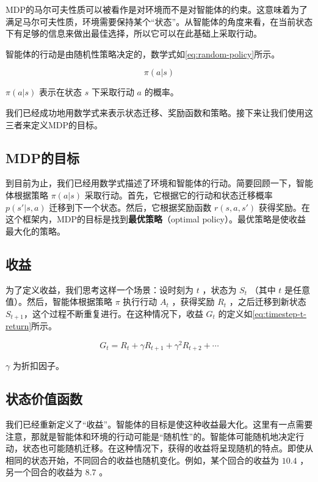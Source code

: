 \documentclass[lang=cn,newtx,10pt,scheme=chinese]{elegantbook}
\begin{document}
\begin{marker}
MDP的马尔可夫性质可以被看作是对环境而不是对智能体的约束。这意味着为了满足马尔可夫性质，环境需要保持某个``状态''。从智能体的角度来看，在当前状态下有足够的信息来做出最佳选择，所以它可以在此基础上采取行动。
\end{marker}

智能体的行动是由随机性策略决定的，数学式如\ref{eq:random-policy}所示。

\begin{equation}\label{eq:random-policy}
\pi(a|s)
\end{equation}

$\pi(a|s)$ 表示在状态 $s$ 下采取行动 $a$ 的概率。

我们已经成功地用数学式来表示状态迁移、奖励函数和策略。接下来让我们使用这三者来定义MDP的目标。

\subsection{MDP的目标}

到目前为止，我们已经用数学式描述了环境和智能体的行动。简要回顾一下，智能体根据策略 $\pi(a|s)$ 采取行动。首先，它根据它的行动和状态迁移概率 $p(s'|s,a)$ 迁移到下一个状态。然后，它根据奖励函数 $r(s,a,s')$ 获得奖励。在这个框架内，MDP的目标是找到\textbf{最优策略}（optimal policy）。最优策略是使收益最大化的策略。

\subsection{收益}

为了定义收益，我们思考这样一个场景：设时刻为 $t$ ，状态为 $S_t$ （其中 $t$ 是任意值）。然后，智能体根据策略 $\pi$ 执行行动 $A_t$ ，获得奖励 $R_t$ ，之后迁移到新状态 $S_{t+1}$，这个过程不断重复进行。在这种情况下，收益 $G_t$ 的定义如\ref{eq:timestep-t-return}所示。

\begin{equation}\label{eq:timestep-t-return}
G_t = R_t + \gamma R_{t+1} + \gamma^2 R_{t+2} + \cdots
\end{equation}

$\gamma$ 为折扣因子。

\subsection{状态价值函数}

我们已经重新定义了``收益''。智能体的目标是使这种收益最大化。这里有一点需要注意，那就是智能体和环境的行动可能是``随机性''的。智能体可能随机地决定行动，状态也可能随机迁移。在这种情况下，获得的收益将呈现随机的特点。即使从相同的状态开始，不同回合的收益也随机变化。例如，某个回合的收益为 $10.4$ ，另一个回合的收益为 $8.7$ 。
\end{document}

